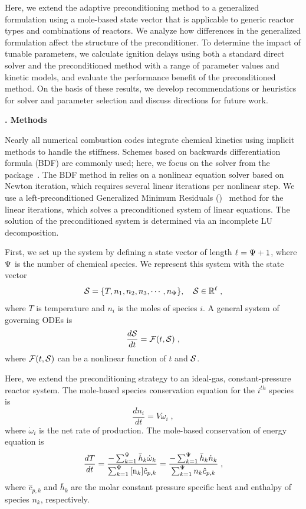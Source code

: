 \documentclass[twocolumn,10pt]{article} %
\renewcommand{\section}%
              [1]%
              {%
               \bgroup%
               \flushleft%
               \small\bf%
               \stepcounter{section}%
               \arabic{section}. #1%
               \par%
               \egroup%
              }%
\newcommand{\sectionOne}[1]{\section{#1} \addvspace{10pt}}
\begin{document}
Here, we extend the adaptive preconditioning method to a generalized formulation using a mole-based state vector that is applicable to generic reactor types and combinations of reactors.
We analyze how differences in the generalized formulation affect the structure of the preconditioner.
To determine the impact of tunable parameters, we calculate ignition delays using both a standard direct solver and the preconditioned method with a range of parameter values and kinetic models, and evaluate the performance benefit of the preconditioned method.
On the basis of these results, we develop recommendations or heuristics for solver and parameter selection and discuss directions for future work.


\sectionOne{Methods}
\label{p1:methods-section}

Nearly all numerical combustion codes integrate chemical kinetics using implicit methods to handle the stiffness.
Schemes based on backwards differentiation formula (BDF) are commonly used; here, we focus on the \cvodes{} solver from the \sundials{} package~\cite{cohen_cvode_1996, hindmarsh_sundials_2005}.
The BDF method in \cvodes{} relies on a nonlinear equation solver based on Newton iteration, which requires several linear iterations per nonlinear step.
We use a left-preconditioned Generalized Minimum Residuals (\gmres{})~\cite{trefethen_numerical_1997} method for the linear iterations, which solves a preconditioned system of linear equations.
The solution of the preconditioned system is determined via an incomplete LU decomposition.

First, we set up the system by defining a state vector of length $\ell = \nspecies + 1$, where $\nspecies$ is the number of chemical species.
We represent this system with the state vector
\begin{equation}
    \S{} = \{T, n_1, n_2, n_3, \cdots, n_{\nspecies}\},\quad\S{}\in\mathbb{R}^\ell \;,
\end{equation}
where $T$ is temperature and $n_i$ is the moles of species $i$.
A general system of governing ODEs is
\begin{equation}
    \label{eq:ode-system}
    \frac{d\S{}}{dt} = \F{t,\S{}} \;,
\end{equation}
where $\F{t,\S{}}$ can be a nonlinear function of $t$ and $\S{}$.

Here, we extend the preconditioning strategy to an ideal-gas, constant-pressure reactor system.
The mole-based species conservation equation for the $i^{th}$ species is
\begin{equation}
    \label{eq:species-cons}
    \frac{dn_i}{dt} = V \dot{\omega}_{i} \;,
\end{equation}
where $\dot{\omega}_{i}$ is the net rate of production.
The mole-based conservation of energy equation is
\begin{equation}
    \label{eq:mole-energy}
    \frac{dT}{dt} = \frac{-\SpecSum{\bar{h}_k\dot{\omega}_k}}{\SpecSum{\conc{n_k} \hat{c}_{p,k}}} = \frac{-\SpecSum{\bar{h}_k\dot{n}_k}}{ \SpecSum{n_k \hat{c}_{p,k}}}\;,
\end{equation}
where $\hat{c}_{p,k}$ and $\bar{h}_k$ are the molar constant pressure specific heat and enthalpy of species $n_k$, respectively.
\end{document}
